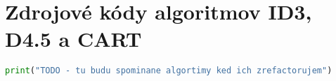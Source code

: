 \chapter{Zdrojové kódy algoritmov ID3, D4.5 a CART}

\begin{lstlisting}[language=python, label=src:test,caption={asss }]
print("TODO - tu budu spominane algortimy ked ich zrefactorujem")
\end{lstlisting}
